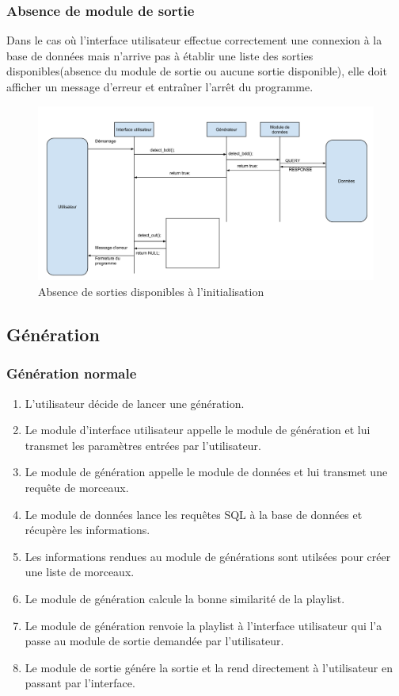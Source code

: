\documentclass[11pt,a4paper]{article}
\begin{document}
\subsubsection{Absence de module de sortie}

Dans le cas où l'interface utilisateur effectue correctement une connexion à la
base de données mais n'arrive pas à établir une liste des sorties
disponibles(absence du module de sortie ou aucune sortie disponible), elle doit
afficher un message d'erreur et entraîner l'arrêt du programme.
        
\begin{figure}[!h]
\includegraphics[width=14cm]{demarrage_absence_sortie.png}
\caption{Absence de sorties disponibles à l'initialisation}
\end{figure}
 
\subsection{Génération}

\subsubsection{Génération normale}

\begin{enumerate}
\item L'utilisateur décide de lancer une génération.
\item Le module d'interface utilisateur appelle le module de génération et lui
transmet les paramètres entrées par l'utilisateur.
\item Le module de génération appelle le module de données et lui transmet une
requête de morceaux.
\item Le module de données lance les requêtes SQL à la base de données et
récupère les informations.
\item Les informations rendues au module de générations sont utilsées pour
créer une liste de morceaux.
\item Le module de génération calcule la bonne similarité de la playlist.
\item Le module de génération renvoie la playlist à l'interface utilisateur qui
l'a passe au module de sortie demandée par l'utilisateur.
\item Le module de sortie génére la sortie et la rend directement à
l'utilisateur en passant par l'interface.
\end{enumerate}
\end{document}
